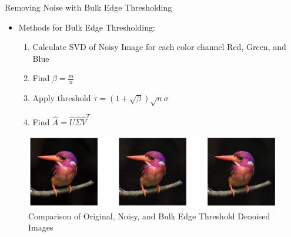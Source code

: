 \documentclass[aspectratio=169,xcolor=dvipsnames]{beamer}
\begin{document}
	
	\begin{frame}{Removing Noise with Bulk Edge Thresholding}
		\begin{itemize}
			\item Methods for Bulk Edge Thresholding: 
			\begin{enumerate}
				\item Calculate SVD of Noisy Image for each color channel Red, Green, and Blue
				\item Find $\beta = \frac{m}{n}$
				\item Apply threshold $\tau = (1+\sqrt{\beta})\sqrt{n}\sigma$
				\item Find $\hat{A} = \hat{U}\hat{\Sigma}\hat{V}^T$
			\end{enumerate}
		\end{itemize}
		\begin{figure}
			\includegraphics[scale=0.4]{BulkDenoise.png}
			\caption{Comparison of Original, Noisy, and Bulk Edge Threshold Denoised Images}
		\end{figure}
	\end{frame}
	
	
\end{document}
